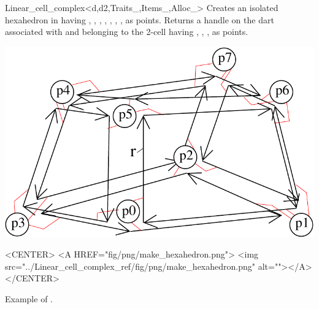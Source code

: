 \begin{ccRefClass}{Linear_cell_complex<d,d2,Traits_,Items_,Alloc_>}
{Creates an isolated hexahedron in  having , ,
, , , , ,  as points.
  Returns a handle on the dart associated with  and
  belonging to the 2-cell having , , , 
  as points.
}
\def\LargFig{.4\textwidth}
  \begin{ccTexOnly}
    \begin{center}
      \includegraphics[width=\LargFig]{Linear_cell_complex_ref/fig/pdf/make_hexahedron}
    \end{center}
  \end{ccTexOnly}
  \begin{ccHtmlOnly}
    <CENTER>
    <A HREF="fig/png/make_hexahedron.png">
        <img src="../Linear_cell_complex_ref/fig/png/make_hexahedron.png" alt=""></A>
    </CENTER>
    \end{ccHtmlOnly}
    \centerline{Example of .}

\ccSeeAlso
{}\\
\\
\\
\\
\\
\\

\end{ccRefClass}
\ccRefPageEnd
